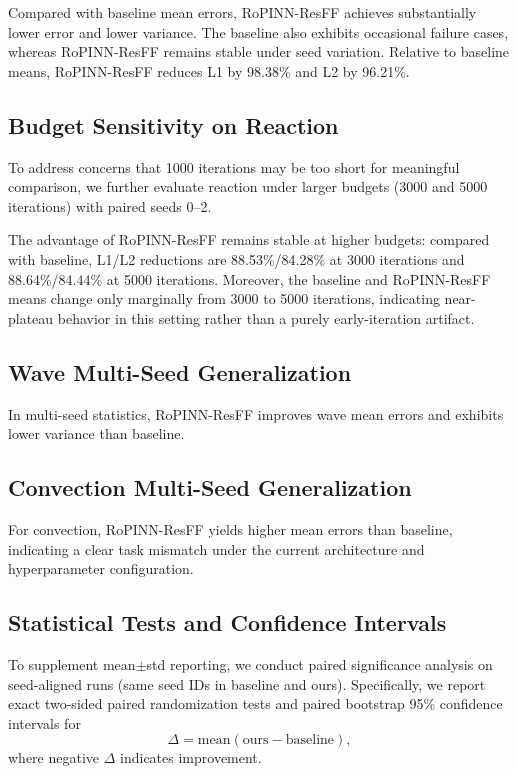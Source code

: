 

Compared with baseline mean errors, RoPINN-ResFF achieves substantially lower error and lower variance. The baseline also exhibits occasional failure cases, whereas RoPINN-ResFF remains stable under seed variation. Relative to baseline means, RoPINN-ResFF reduces L1 by 98.38\% and L2 by 96.21\%.

\subsection{Budget Sensitivity on Reaction}
To address concerns that 1000 iterations may be too short for meaningful comparison, we further evaluate reaction under larger budgets (3000 and 5000 iterations) with paired seeds 0--2.



The advantage of RoPINN-ResFF remains stable at higher budgets: compared with baseline, L1/L2 reductions are 88.53\%/84.28\% at 3000 iterations and 88.64\%/84.44\% at 5000 iterations. Moreover, the baseline and RoPINN-ResFF means change only marginally from 3000 to 5000 iterations, indicating near-plateau behavior in this setting rather than a purely early-iteration artifact.

\subsection{Wave Multi-Seed Generalization}


In multi-seed statistics, RoPINN-ResFF improves wave mean errors and exhibits lower variance than baseline.

\subsection{Convection Multi-Seed Generalization}


For convection, RoPINN-ResFF yields higher mean errors than baseline, indicating a clear task mismatch under the current architecture and hyperparameter configuration.

\subsection{Statistical Tests and Confidence Intervals}
To supplement mean$\pm$std reporting, we conduct paired significance analysis on seed-aligned runs (same seed IDs in baseline and ours). Specifically, we report exact two-sided paired randomization tests and paired bootstrap 95\% confidence intervals for
\[
\Delta=\mathrm{mean}(\mathrm{ours}-\mathrm{baseline}),
\]
where negative $\Delta$ indicates improvement.


